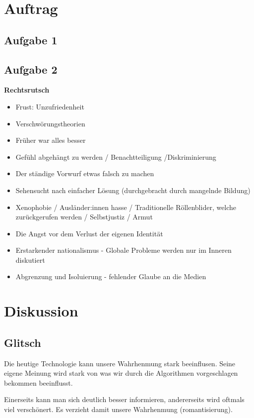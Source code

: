 \documentclass{article}
\begin{document}
\section{Auftrag}
\subsection{Aufgabe 1}

\subsection{Aufgabe 2}
\textbf{Rechtsrutsch}
\begin{multicols}{2}
\begin{itemize}[parsep=0pt]
    \item Frust: Unzufriedenheit
    \item Verschwörungstheorien
    \item Früher war alles besser
    \item Gefühl abgehängt zu werden / Benachtteiligung /Diskriminierung
    \item Der ständige Vorwurf etwas falsch zu machen
    \item Sehensucht nach einfacher Lösung (durchgebracht durch mangelnde Bildung)
    \item Xenophobie / Ausländer:innen hasse / Traditionelle Röllenblider, welche zurückgerufen werden / Selbstjustiz / Armut
    \item Die Angst vor dem Verlust der eigenen Identität
    \item Erstarkender nationalismus - Globale Probleme werden nur im Inneren diskutiert
    \item Abgrenzung und Isoluierung - fehlender Glaube an die Medien
\end{itemize}
\end{multicols}
\section{Diskussion}
\subsection{Glitsch}
Die heutige Technologie kann unsere Wahrhenmung stark beeinflusen. Seine eigene Meinung wird stark von was wir durch die Algorithmen vorgeschlagen bekommen beeinflusst.

Einerseits kann man sich deutlich besser informieren, andererseits wird oftmals viel verschönert. Es verzieht damit unsere Wahrhenmung (romantisierung).
\end{document}
